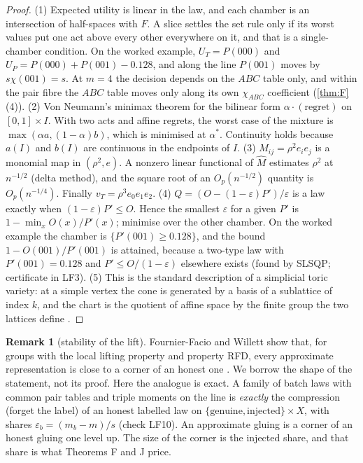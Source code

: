 \documentclass[11pt]{article}
\theoremstyle{definition}\newtheorem{definition}{Definition}\newtheorem{remark}{Remark}
\begin{document}
\begin{proof}
(1) Expected utility is linear in the law, and each chamber is an intersection of half-spaces with $F$. A slice settles the set rule
only if its worst values put one act above every other everywhere on it, and that is a single-chamber condition. On the worked example,
$U_T=P(000)$ and $U_P=P(000)+P(001)-0.128$, and along the line $P(001)$ moves by $s\chi(001)=s$. At $m=4$ the decision depends on the
$ABC$ table only, and within the pair fibre the $ABC$ table moves only along its own $\chi_{ABC}$ coefficient (\cref{thm:F}(4)).
(2) Von Neumann's minimax theorem for the bilinear form $\alpha\cdot(\text{regret})$ on $[0,1]\times I$. With two acts and affine regrets,
the worst case of the mixture is $\max(\alpha a,(1-\alpha)b)$, which is minimised at $\alpha^*$. Continuity holds because $a(I)$ and
$b(I)$ are continuous in the endpoints of $I$.
(3) $M_{ij}=\rho^2e_ie_j$ is a monomial map in $(\rho^2,e)$. A nonzero linear functional of $\hat M$ estimates $\rho^2$ at $n^{-1/2}$
(delta method), and the square root of an $O_p(n^{-1/2})$ quantity is $O_p(n^{-1/4})$. Finally $v_T=\rho^3e_0e_1e_2$.
(4) $Q=(O-(1-\varepsilon)P')/\varepsilon$ is a law exactly when $(1-\varepsilon)P'\le O$. Hence the smallest $\varepsilon$ for a given $P'$
is $1-\min_xO(x)/P'(x)$; minimise over the other chamber. On the worked example the chamber is $\{P'(001)\ge0.128\}$, and the bound
$1-O(001)/P'(001)$ is attained, because a two-type law with $P'(001)=0.128$ and $P'\le O/(1-\varepsilon)$ elsewhere exists (found by
SLSQP; certificate in LF3).
(5) This is the standard description of a simplicial toric variety: at a simple vertex the cone is generated by a basis of a sublattice
of index $k$, and the chart is the quotient of affine space by the finite group the two lattices define \cite{Delzant1988,LermanTolman1997}.
\end{proof}

\begin{remark}[stability of the lift]
Fournier-Facio and Willett show that, for groups with the local lifting property and property RFD, every approximate representation is
close to a corner of an honest one \cite{FournierFacioWillett2026}. We borrow the shape of the statement, not its proof. Here the
analogue is exact. A family of batch laws with common pair tables and triple moments on the line is \emph{exactly} the compression
(forget the label) of an honest labelled law on $\{\text{genuine},\text{injected}\}\times X$, with shares
$\varepsilon_b=(m_b-m)/s$ (check LF10). An approximate gluing is a corner of an honest gluing one level up. The size of the corner is
the injected share, and that share is what Theorems F and J price.
\end{remark}
\end{document}
